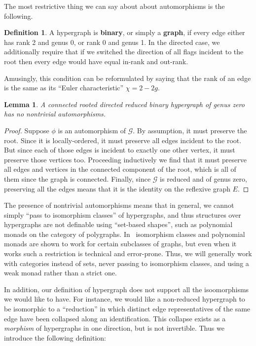 \documentclass{article}
\newtheorem{lem}[thm]{Lemma}
\theoremstyle{definition}
\newtheorem{defn}[thm]{Definition}
\theoremstyle{remark}
\def\G{\mathcal{G}}
\def\genus{\mathsf{genus}}
\def\rank{\mathsf{rank}}
\begin{document}
The most restrictive thing we can say about about automorphisms is the following.

\begin{defn}\label{defn:binary}
  A hypergraph is \textbf{binary}, or simply a \textbf{graph}, if %
  every edge either has rank 2 and genus 0, or rank 0 and genus 1.
  In the directed case, we additionally require that if we switched the direction of all flags incident to the root then every edge would have equal in-rank and out-rank.
\end{defn}

Amusingly, this condition can be reformulated by saying that the rank of an edge is the same as its ``Euler characteristic'' $\chi=2-2g$.

\begin{lem}
  A connected rooted directed reduced binary hypergraph of genus zero has no nontrivial automorphisms.
\end{lem}
\begin{proof}
  Suppose $\phi$ is an automorphism of $\G$.
  By assumption, it must preserve the root.
  Since it is locally-ordered, it must preserve all edges incident to the root.
  But since each of those edges is incident to exactly one other vertex, it must preserve those vertices too.
  Proceeding inductively we find that it must preserve all edges and vertices in the connected component of the root, which is all of them since the graph is connected.
  Finally, since $\G$ is reduced and of genus zero, preserving all the edges means that it is the identity on the reflexive graph $E$.
\end{proof}

The presence of nontrivial automorphisms means that in general, we cannot simply ``pass to isomorphism classes'' of hypergraphs, and thus structures over hypergraphs are not definable using ``set-based shapes'', such as polynomial monads on the category of polygraphs.
In~\cite{bb:htapm} isomorphism classes and polynomial monads are shown to work for certain subclasses of graphs, but even when it works such a restriction is technical and error-prone.
Thus, we will generally work with categories instead of sets, never passing to isomorphism classes, and using a weak monad rather than a strict one.

In addition, our definition of hypergraph does not support all the isoomorphisms we would like to have.
For instance, we would like a non-reduced hypergraph to be isomorphic to a ``reduction'' in which distinct edge representatives of the same edge have been collapsed along an identification.
This collapse exists as a \emph{morphism} of hypergraphs in one direction, but is not invertible.
Thus we introduce the following definition:
\end{document}

